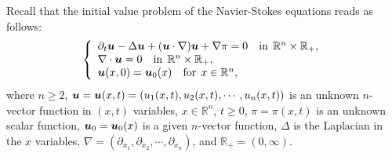 \documentclass[11pt]{article}
\newcommand{\bfu}{{\mbox{\boldmath $u$}}}
\begin{document}
  Recall that the initial value problem of the Navier-Stokes equations reads as follows:
\begin{eqnarray}
\left\{
\begin{array}{l}
  \partial_t\bfu-\Delta\bfu+(\bfu\cdot\nabla)\bfu+\nabla\pi=0\quad \mbox{in}\;\,\mathbb{R}^n\times\mathbb{R}_+,\\
  \nabla\cdot\bfu=0\quad \mbox{in}\;\,\mathbb{R}^n\times\mathbb{R}_+,\\
  \bfu(x,0)=\bfu_0(x)\quad \mbox{for}\;\, x\in\mathbb{R}^n,
\end{array}
\right.
\end{eqnarray}
  where $n\geq 2$, $\bfu=\bfu(x,t)=(u_1(x,t),u_2(x,t),\cdots,u_n(x,t))$ is an unknown $n$-vector function in $(x,t)$ variables, $x\in\mathbb{R}^n$,
  $t\geq 0$, $\pi=\pi(x,t)$ is an unknown scalar function, $\bfu_0=\bfu_0(x)$ is a given $n$-vector function, $\Delta$ is the Laplacian in the $x$
  variables, $\nabla=(\partial_{x_1},\partial_{x_2},\cdots,\partial_{x_n})$, and $\mathbb{R}_+=(0,\infty)$.
\end{document}
